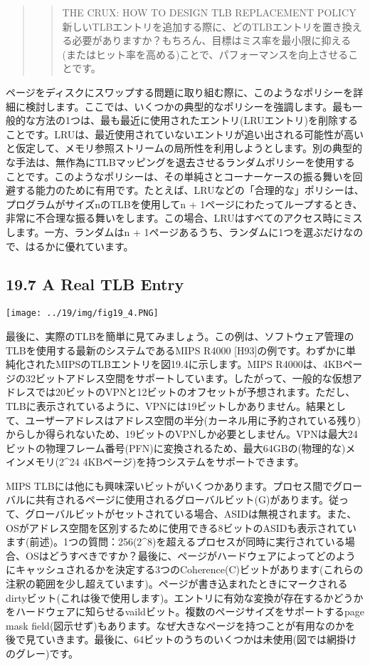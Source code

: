 \begin{quote}
\begin{quote}
THE CRUX: HOW TO DESIGN TLB REPLACEMENT POLICY\\
新しいTLBエントリを追加する際に、どのTLBエントリを置き換える必要がありますか？もちろん、目標はミス率を最小限に抑える(またはヒット率を高める)ことで、パフォーマンスを向上させることです。
\end{quote}
\end{quote}

ページをディスクにスワップする問題に取り組む際に、このようなポリシーを詳細に検討します。ここでは、いくつかの典型的なポリシーを強調します。最も一般的な方法の1つは、最も最近に使用されたエントリ(LRUエントリ)を削除することです。LRUは、最近使用されていないエントリが追い出される可能性が高いと仮定して、メモリ参照ストリームの局所性を利用しようとします。別の典型的な手法は、無作為にTLBマッピングを退去させるランダムポリシーを使用することです。このようなポリシーは、その単純さとコーナーケースの振る舞いを回避する能力のために有用です。たとえば、LRUなどの「合理的な」ポリシーは、プログラムがサイズnのTLBを使用してn
+
1ページにわたってループするとき、非常に不合理な振る舞いをします。この場合、LRUはすべてのアクセス時にミスします。一方、ランダムはn
+ 1ページあるうち、ランダムに1つを選ぶだけなので、はるかに優れています。

\hypertarget{a-real-tlb-entry}{%
\subsection*{19.7 A Real TLB Entry}\label{a-real-tlb-entry}}

\texttt{[image: ../19/img/fig19\_4.PNG]}

最後に、実際のTLBを簡単に見てみましょう。この例は、ソフトウェア管理のTLBを使用する最新のシステムであるMIPS
R4000
{[}H93{]}の例です。わずかに単純化されたMIPSのTLBエントリを図19.4に示します。MIPS
R4000は、4KBページの32ビットアドレス空間をサポートしています。したがって、一般的な仮想アドレスでは20ビットのVPNと12ビットのオフセットが予想されます。ただし、TLBに表示されているように、VPNには19ビットしかありません。結果として、ユーザーアドレスはアドレス空間の半分(カーネル用に予約されている残り)からしか得られないため、19ビットのVPNしか必要としません。VPNは最大24ビットの物理フレーム番号(PFN)に変換されるため、最大64GBの(物理的な)メインメモリ(2\^{}24
4KBページ)を持つシステムをサポートできます。

MIPS
TLBには他にも興味深いビットがいくつかあります。プロセス間でグローバルに共有されるページに使用されるグローバルビット(G)があります。従って、グローバルビットがセットされている場合、ASIDは無視されます。また、OSがアドレス空間を区別するために使用できる8ビットのASIDも表示されています(前述)。1つの質問：256(2\^{}8)を超えるプロセスが同時に実行されている場合、OSはどうすべきですか？最後に、ページがハードウェアによってどのようにキャッシュされるかを決定する3つのCoherence(C)ビットがあります(これらの注釈の範囲を少し超えています)。ページが書き込まれたときにマークされるdirtyビット(これは後で使用します)。エントリに有効な変換が存在するかどうかをハードウェアに知らせるvaildビット。複数のページサイズをサポートするpage
mask
field(図示せず)もあります。なぜ大きなページを持つことが有用なのかを後で見ていきます。最後に、64ビットのうちのいくつかは未使用(図では網掛けのグレー)です。


